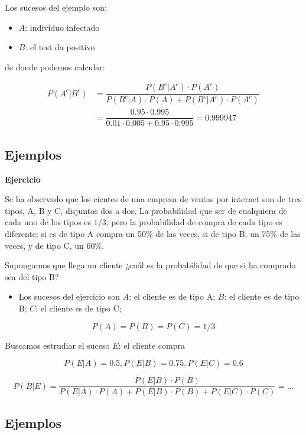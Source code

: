 \documentclass[]{book}
\providecommand{\tightlist}{%
  \setlength{\itemsep}{0pt}\setlength{\parskip}{0pt}}
\begin{document}
Los sucesos del ejemplo son:

\begin{itemize}
\tightlist
\item
  \(A\): individuo infectado
\item
  \(B\): el test da positivo
\end{itemize}

de donde podemos calcular:

\[
\begin{array}{rl} P(A^c|B^c)& =\dfrac{P(B^c|A^c)\cdot P(A^c)}{P(B^c|A)\cdot P(A)+P(B^c|A^c)\cdot P(A^c)}\\ & =\dfrac{0.95\cdot 0.995}{0.01\cdot 0.005+0.95\cdot 0.995}=0.999947\end{array}
\]

\hypertarget{ejemplos-8}{%
\subsection{Ejemplos}\label{ejemplos-8}}

\textbf{Ejercicio}

Se ha observado que los cientes de una empresa de ventas por internet son de tres tipos, A, B y C, disjuntos dos a dos. La probabilidad que ser de cualquiera de cada uno de los tipos es \(1/3\), pero la probabilidad de compra de cada tipo es diferente: si es de tipo A compra un 50\% de las veces, si de tipo B, un 75\% de las veces, y de tipo C, un 60\%.

Supongamos que llega un cliente ¿cuál es la probabilidad de que si ha comprado sea del tipo B?

\begin{itemize}
\tightlist
\item
  Los sucesos del ejercicio son \(A\): el cliente es de tipo A; \(B\): el cliente es de tipo B; \(C\): el cliente es de tipo C;
\end{itemize}

\[P(A)=P(B)=P(C)=1/3\]

Buscamos estrudiar el suceso \(E\): el cliente compra

\[P(E|A)=0.5, P(E|B)=0.75, P(E|C)=0.6\]

\[P(B|E)\!=\!\dfrac{P(E|B)\cdot P(B)}{P(E|A)\!\cdot\! P(A)\!+\!P(E|B)\!\cdot\! P(B)\!+\!P(E|C)\!\cdot\! P(C)}\!=\!\ldots\]

\hypertarget{ejemplos-9}{%
\subsection{Ejemplos}\label{ejemplos-9}}
\end{document}
